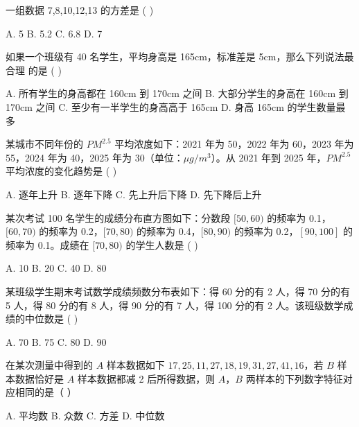 \documentclass[11pt, a4paper]{article}
\begin{document}
\begin{baitap}[6]
一组数据 7,8,10,12,13 的方差是 ( )
\par\vspace{3pt}
\noindent A. 5 \quad B. 5.2 \quad C. 6.8 \quad D. 7
\end{baitap}

\begin{baitap}[7]
如果一个班级有 40 名学生，平均身高是 165cm，标准差是 5cm，那么下列说法最合理 的是 ( )
\par\vspace{3pt}
\noindent A. 所有学生的身高都在 160cm 到 170cm 之间 \quad B. 大部分学生的身高在 160cm 到 170cm 之间 \quad C. 至少有一半学生的身高高于 165cm \quad D. 身高 165cm 的学生数量最多
\end{baitap}

\begin{baitap}[8]
某城市不同年份的 $PM^{2.5}$ 平均浓度如下：2021 年为 50，2022 年为 60，2023 年为 55，2024 年为 40，2025 年为 30（单位：$\mu g/m^3$）。从 2021 年到 2025 年，$PM^{2.5}$ 平均浓度的变化趋势是 ( )
\par\vspace{3pt}
\noindent A. 逐年上升 \quad B. 逐年下降 \quad C. 先上升后下降 \quad D. 先下降后上升
\end{baitap}

\begin{baitap}[9]
某次考试 100 名学生的成绩分布直方图如下：分数段 $[50,60)$ 的频率为 0.1，$[60,70)$ 的频率为 0.2，$[70,80)$ 的频率为 0.4，$[80,90)$ 的频率为 0.2，$[90,100]$ 的频率为 0.1。成绩在 $[70,80)$ 的学生人数是 ( )
\par\vspace{3pt}
\noindent A. 10 \quad B. 20 \quad C. 40 \quad D. 80
\end{baitap}

\begin{baitap}[10]
某班级学生期末考试数学成绩频数分布表如下：得 60 分的有 2 人，得 70 分的有 5 人，得 80 分的有 8 人，得 90 分的有 7 人，得 100 分的有 2 人。该班级数学成绩的中位数是 ( )
\par\vspace{3pt}
\noindent A. 70 \quad B. 75 \quad C. 80 \quad D. 90
\end{baitap}

\begin{baitap}[11]
在某次测量中得到的 $A$ 样本数据如下 $17, 25, 11, 27, 18, 19, 31, 27, 41, 16$，若 $B$ 样本数据恰好是 $A$ 样本数据都减 2 后所得数据，则 $A$，$B$ 两样本的下列数字特征对应相同的是（ ）
\par\vspace{3pt}
\noindent A. 平均数 \quad B. 众数 \quad C. 方差 \quad D. 中位数
\end{baitap}
\end{document}
